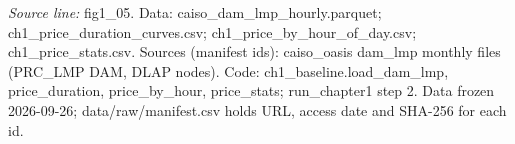 {\scriptsize\textit{Source line:} fig1\_\allowbreak{}05. Data: caiso\_\allowbreak{}dam\_\allowbreak{}lmp\_\allowbreak{}hourly.parquet; ch1\_\allowbreak{}price\_\allowbreak{}duration\_\allowbreak{}curves.csv; ch1\_\allowbreak{}price\_\allowbreak{}by\_\allowbreak{}hour\_\allowbreak{}of\_\allowbreak{}day.csv; ch1\_\allowbreak{}price\_\allowbreak{}stats.csv. Sources (manifest ids): caiso\_\allowbreak{}oasis dam\_\allowbreak{}lmp monthly files (PRC\_\allowbreak{}LMP DAM, DLAP nodes). Code: ch1\_\allowbreak{}baseline.load\_\allowbreak{}dam\_\allowbreak{}lmp, price\_\allowbreak{}duration, price\_\allowbreak{}by\_\allowbreak{}hour, price\_\allowbreak{}stats; run\_\allowbreak{}chapter1 step 2. Data frozen 2026-09-26; data/raw/manifest.csv holds URL, access date and SHA-256 for each id.}